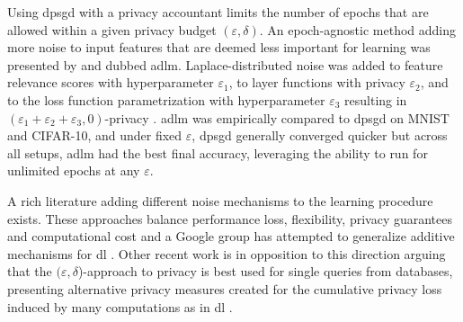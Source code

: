 \documentclass[12pt,fleqn,twocolumn]{article}
\begin{document}
Using \acrshort{dpsgd} with a privacy accountant limits the number of epochs that are allowed within a given privacy budget $(\varepsilon, \delta)$.
An epoch-agnostic method adding more noise to input features that are deemed less important for learning was presented by \textcite{Phan2017AdaptiveLM} and dubbed \acrfull{adlm}.
Laplace-distributed noise was added to feature relevance scores with hyperparameter $\varepsilon_1$, to layer functions with privacy $\varepsilon_2$, and to the loss function parametrization with hyperparameter $\varepsilon_3$ resulting in $(\varepsilon_1+\varepsilon_2+\varepsilon_3, 0)$-privacy \cite[III. D]{Phan2017AdaptiveLM}.
\acrshort{adlm} was empirically compared to \acrshort{dpsgd} on MNIST and CIFAR-10, and under fixed $\varepsilon$, \acrshort{dpsgd} generally converged quicker but across all setups, \acrshort{adlm} had the best final accuracy, leveraging the ability to run for unlimited epochs at any $\varepsilon$.

A rich literature adding different noise mechanisms to the learning procedure exists.
These approaches balance performance loss, flexibility, privacy guarantees and computational cost and a Google group has attempted to generalize additive mechanisms for \acrshort{dl} \cite{McMahan2018AGA}.
Other recent work is in opposition to this direction arguing that the $(\varepsilon, \delta$)-approach to privacy is best used for single queries from databases, presenting alternative privacy measures created for the cumulative privacy loss induced by many computations as in \acrshort{dl} \cite{Yu2019DifferentiallyPM}.
\end{document}
